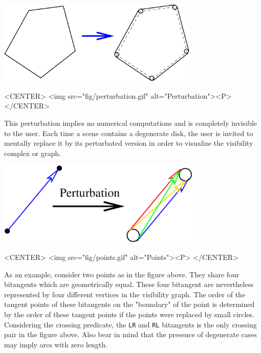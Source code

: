 \begin{ccTexOnly}
    \begin{center}
        \includegraphics[height=4cm]{Visibility_complex/fig/perturbation}%
    \end{center}
\end{ccTexOnly}

\begin{ccHtmlOnly}
    <CENTER>
        <img src="fig/perturbation.gif" alt="Perturbation"><P>
    </CENTER>
\end{ccHtmlOnly}

This perturbation implies no numerical computations and is completely
invisible to the user. Each time a scene contains a degenerate disk, the user
is invited to mentally replace it by its perturbated version in order to
visualize the visibility complex or graph. 

\begin{ccTexOnly}
    \begin{center}
        \includegraphics[height=4cm]{Visibility_complex/fig/points}%
    \end{center}
\end{ccTexOnly}

\begin{ccHtmlOnly}
    <CENTER>
        <img src="fig/points.gif" alt="Points"><P>
    </CENTER>
\end{ccHtmlOnly}

As an example, consider two points as in the figure above. They share four
bitangents which are geometrically equal. These four bitangent are
nevertheless represented by four different vertices in the visibility
graph. The order of the tangent points of these bitangents on the
"boundary" of the point is determined by the order of these tangent points
if the points were replaced by small circles. Considering the crossing
predicate, the \texttt{LR} and \texttt{RL} bitangents is the only crossing
pair in the figure above.  Also bear in mind that the presence of
degenerate cases may imply arcs with zero length.


